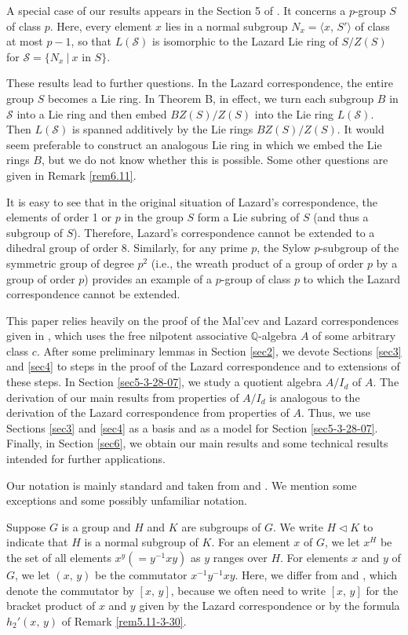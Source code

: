 \documentclass[mathscr]{amsart}
\theoremstyle{theorem}
\theoremstyle{definition}
\numberwithin{equation}{section}
\def\Q{\mathbb{Q}}
\def\S{\mathcal{S}}
\begin{document}
A special case of our results appears in the Section 5 of
\cite{GG-SMI}. It concerns a $p$-group $S$ of class $p$. Here, every
element $x$ lies in a normal subgroup $N_x=\langle x,\,S'\rangle$ of
class at most $p-1$, so that $L(\S)$ is isomorphic to the Lazard Lie
ring of $S/Z(S)$ for $\S=\{N_x\ |\ x\text{ in }S\}$.

These results lead to further questions. In the Lazard
correspondence, the entire group $S$ becomes a Lie ring. In Theorem
B, in effect, we turn each subgroup $B$ in $\S$ into a Lie ring and
then embed $BZ(S)/Z(S)$ into the Lie ring $L(\S).$ Then $L(\S)$ is
spanned additively by the Lie rings $BZ(S)/Z(S)$. It would seem
preferable to construct an analogous Lie ring in which we embed the
Lie rings $B$, but we do not know whether this is possible. Some
other questions are given in Remark \ref{rem6.11}.

It is easy to see that in the original situation of Lazard's
correspondence, the elements of order 1 or $p$ in the group $S$ form
a Lie subring of $S$ (and thus a subgroup of $S$). Therefore,
Lazard's correspondence cannot be extended to a dihedral group of
order 8. Similarly, for any prime $p$, the Sylow $p$-subgroup of the
symmetric group of degree $p^2$ (i.e., the wreath product of a group
of order $p$ by a group of order $p$) provides an example of a
$p$-group of class $p$ to which the Lazard correspondence cannot be
extended.

This paper relies heavily on the proof of the Mal'cev and Lazard
correspondences given in \cite{Kh}, which uses the free nilpotent
associative $\Q$-algebra $A$ of some arbitrary class $c.$ After some
preliminary lemmas in Section \ref{sec2}, we devote Sections
\ref{sec3} and \ref{sec4} to steps in the proof of the Lazard
correspondence and to extensions of these steps. In Section
\ref{sec5-3-28-07}, we study a quotient algebra $A/I_d$ of $A$. The
derivation of our main results from properties of $A/I_d$ is
analogous to the derivation of the Lazard correspondence from
properties of $A$. Thus, we use Sections \ref{sec3} and \ref{sec4}
as a basis and as a model for Section \ref{sec5-3-28-07}. Finally,
in Section \ref{sec6}, we obtain our main results and some technical
results intended for further applications.

Our notation is mainly standard and taken from \cite{Gor} and
\cite{Kh}. We mention some exceptions and some possibly unfamiliar
notation.

Suppose $G$ is a group and $H$ and $K$ are subgroups of $G$. We
write $H\lhd K$ to indicate that $H$ is a normal subgroup of $K$.
For an element $x$ of $G$, we let $x^H$ be the set of all elements
$x^y(=y^{-1}xy)$ as $y$ ranges over $H$. For elements $x$ and $y$ of
$G$, we let $(x,\,y)$ be the commutator $x^{-1}y^{-1}xy$. Here, we
differ from \cite{Gor} and \cite{Kh}, which denote the commutator by
$[x,\,y]$, because we often need to write $[x,\,y]$ for the bracket
product of $x$ and $y$ given by the Lazard correspondence or by the
formula $h_2'(x,\,y)$ of Remark \ref{rem5.11-3-30}.
\end{document}
